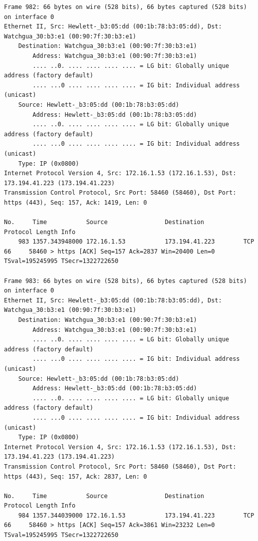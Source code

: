 \documentclass[a4paper,11pt]{article}
\begin{document}
\begin{lstlisting}
Frame 982: 66 bytes on wire (528 bits), 66 bytes captured (528 bits) on interface 0
Ethernet II, Src: Hewlett-_b3:05:dd (00:1b:78:b3:05:dd), Dst: Watchgua_30:b3:e1 (00:90:7f:30:b3:e1)
    Destination: Watchgua_30:b3:e1 (00:90:7f:30:b3:e1)
        Address: Watchgua_30:b3:e1 (00:90:7f:30:b3:e1)
        .... ..0. .... .... .... .... = LG bit: Globally unique address (factory default)
        .... ...0 .... .... .... .... = IG bit: Individual address (unicast)
    Source: Hewlett-_b3:05:dd (00:1b:78:b3:05:dd)
        Address: Hewlett-_b3:05:dd (00:1b:78:b3:05:dd)
        .... ..0. .... .... .... .... = LG bit: Globally unique address (factory default)
        .... ...0 .... .... .... .... = IG bit: Individual address (unicast)
    Type: IP (0x0800)
Internet Protocol Version 4, Src: 172.16.1.53 (172.16.1.53), Dst: 173.194.41.223 (173.194.41.223)
Transmission Control Protocol, Src Port: 58460 (58460), Dst Port: https (443), Seq: 157, Ack: 1419, Len: 0

No.     Time           Source                Destination           Protocol Length Info
    983 1357.343948000 172.16.1.53           173.194.41.223        TCP      66     58460 > https [ACK] Seq=157 Ack=2837 Win=20400 Len=0 TSval=195245995 TSecr=1322722650

Frame 983: 66 bytes on wire (528 bits), 66 bytes captured (528 bits) on interface 0
Ethernet II, Src: Hewlett-_b3:05:dd (00:1b:78:b3:05:dd), Dst: Watchgua_30:b3:e1 (00:90:7f:30:b3:e1)
    Destination: Watchgua_30:b3:e1 (00:90:7f:30:b3:e1)
        Address: Watchgua_30:b3:e1 (00:90:7f:30:b3:e1)
        .... ..0. .... .... .... .... = LG bit: Globally unique address (factory default)
        .... ...0 .... .... .... .... = IG bit: Individual address (unicast)
    Source: Hewlett-_b3:05:dd (00:1b:78:b3:05:dd)
        Address: Hewlett-_b3:05:dd (00:1b:78:b3:05:dd)
        .... ..0. .... .... .... .... = LG bit: Globally unique address (factory default)
        .... ...0 .... .... .... .... = IG bit: Individual address (unicast)
    Type: IP (0x0800)
Internet Protocol Version 4, Src: 172.16.1.53 (172.16.1.53), Dst: 173.194.41.223 (173.194.41.223)
Transmission Control Protocol, Src Port: 58460 (58460), Dst Port: https (443), Seq: 157, Ack: 2837, Len: 0

No.     Time           Source                Destination           Protocol Length Info
    984 1357.344039000 172.16.1.53           173.194.41.223        TCP      66     58460 > https [ACK] Seq=157 Ack=3861 Win=23232 Len=0 TSval=195245995 TSecr=1322722650


\end{lstlisting}
\end{document}
